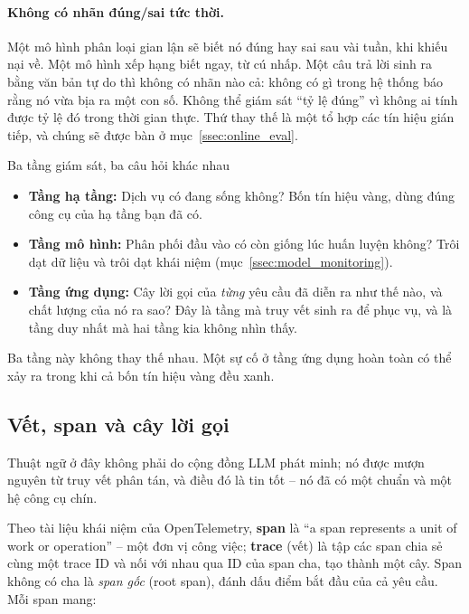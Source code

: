 \paragraph{Không có nhãn đúng/sai tức thời.} Một mô hình phân loại gian lận sẽ biết nó đúng hay sai sau vài tuần, khi khiếu nại về. Một mô hình xếp hạng biết ngay, từ cú nhấp. Một câu trả lời sinh ra bằng văn bản tự do thì không có nhãn nào cả: không có gì trong hệ thống báo rằng nó vừa bịa ra một con số. Không thể giám sát ``tỷ lệ đúng'' vì không ai tính được tỷ lệ đó trong thời gian thực. Thứ thay thế là một tổ hợp các tín hiệu gián tiếp, và chúng sẽ được bàn ở mục~\ref{ssec:online_eval}.

\begin{keyidea}{Ba tầng giám sát, ba câu hỏi khác nhau}
\begin{itemize}
	\item \textbf{Tầng hạ tầng:} Dịch vụ có đang sống không? Bốn tín hiệu vàng, dùng đúng công cụ của hạ tầng bạn đã có.
	\item \textbf{Tầng mô hình:} Phân phối đầu vào có còn giống lúc huấn luyện không? Trôi dạt dữ liệu và trôi dạt khái niệm (mục~\ref{ssec:model_monitoring}).
	\item \textbf{Tầng ứng dụng:} Cây lời gọi của \emph{từng} yêu cầu đã diễn ra như thế nào, và chất lượng của nó ra sao? Đây là tầng mà truy vết sinh ra để phục vụ, và là tầng duy nhất mà hai tầng kia không nhìn thấy.
\end{itemize}
Ba tầng này không thay thế nhau. Một sự cố ở tầng ứng dụng hoàn toàn có thể xảy ra trong khi cả bốn tín hiệu vàng đều xanh.
\end{keyidea}

\subsection{Vết, span và cây lời gọi}
\label{ssec:trace_span}

Thuật ngữ ở đây không phải do cộng đồng LLM phát minh; nó được mượn nguyên từ truy vết phân tán, và điều đó là tin tốt -- nó đã có một chuẩn và một hệ công cụ chín.

Theo tài liệu khái niệm của OpenTelemetry, \textbf{span} là ``a span represents a unit of work or operation'' -- một đơn vị công việc; \textbf{trace} (vết) là tập các span chia sẻ cùng một trace ID và nối với nhau qua ID của span cha, tạo thành một cây. Span không có cha là \emph{span gốc} (root span), đánh dấu điểm bắt đầu của cả yêu cầu. Mỗi span mang:

